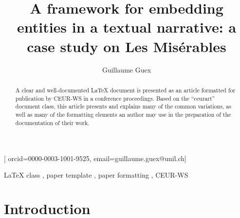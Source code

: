 \documentclass[
twocolumn,
]{ceurart}
\begin{document}


\title{A framework for embedding entities in a textual narrative: a case study on Les Misérables}

\author[1]{Guillaume Guex}[%
orcid=0000-0003-1001-9525,
email=guillaume.guex@unil.ch]
\address[1]{Departement of Language and Information Sciences, University of Lausanne, Switzerland}

\begin{abstract}
  A clear and well-documented \LaTeX{} document is presented as an
  article formatted for publication by CEUR-WS in a conference
  proceedings. Based on the ``ceurart'' document class, this article
  presents and explains many of the common variations, as well as many
  of the formatting elements an author may use in the preparation of
  the documentation of their work.
\end{abstract}

\begin{keywords}
  LaTeX class \sep
  paper template \sep
  paper formatting \sep
  CEUR-WS
\end{keywords}

\maketitle

\section{Introduction}
\end{document}
